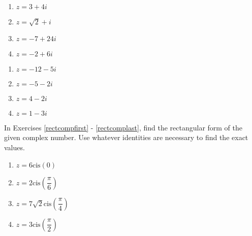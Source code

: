 \begin{multicols}{4} 

\begin{enumerate}

\setcounter{enumi}{\value{HW}}

\item $z = 3 + 4i$
\item $z = \sqrt{2} + i$
\item $z = -7 + 24i$
\item $z = -2+6i$

\setcounter{HW}{\value{enumi}}

\end{enumerate}

\end{multicols}

\begin{multicols}{4} 

\begin{enumerate}

\setcounter{enumi}{\value{HW}}

\item $z = -12-5i$
\item $z = -5-2i$
\item $z = 4-2i$
\item $z = 1-3i$ \label{polarcompbasiclast}

\setcounter{HW}{\value{enumi}}

\end{enumerate}

\end{multicols}

In Exercises \ref{rectcompfirst} - \ref{rectcomplast}, find the rectangular form of the given complex number.  Use whatever identities are necessary to find the exact values.

\begin{multicols}{4}

\begin{enumerate}

\setcounter{enumi}{\value{HW}}

\item $z = 6\text{cis}(0)$  \label{rectcompfirst}
\item $z = 2\text{cis}\left(\dfrac{\pi}{6}\right)$ 
\item $z = 7\sqrt{2}\text{cis}\left(\dfrac{\pi}{4}\right)$
\item $z = 3\text{cis}\left(\dfrac{\pi}{2}\right)$ 

\setcounter{HW}{\value{enumi}}

\end{enumerate}

\end{multicols}

